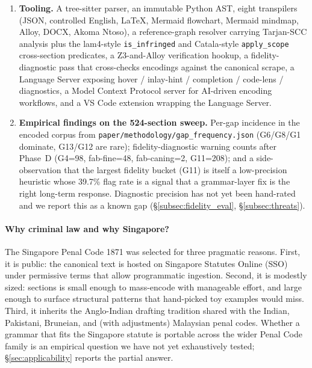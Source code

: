 \begin{enumerate}
\item \textbf{Tooling.} A tree-sitter parser, an immutable Python AST,
eight transpilers (JSON, controlled English, \LaTeX{}, Mermaid
flowchart, Mermaid mindmap, Alloy, DOCX, Akoma Ntoso), a reference-graph resolver carrying Tarjan-SCC
analysis plus the lam4-style \texttt{is\_infringed} and Catala-style
\texttt{apply\_scope} cross-section predicates, a Z3-and-Alloy verification hookup, a fidelity-diagnostic pass
that cross-checks encodings against the canonical scrape, a Language Server
exposing hover / inlay-hint / completion / code-lens / diagnostics, a
Model Context Protocol server for AI-driven encoding workflows, and a
VS Code extension wrapping the Language Server.

\item \textbf{Empirical findings on the 524-section sweep.} Per-gap
incidence in the encoded corpus from
\texttt{paper/methodology/gap\_frequency.json}
(\textsf{G6}/\textsf{G8}/\textsf{G1} dominate, \textsf{G13}/\textsf{G12}
are rare); fidelity-diagnostic warning counts after Phase~D
(\textsf{G4}=98, fab-fine=48, fab-caning=2, \textsf{G11}=208); and a
side-observation that the largest fidelity bucket (\textsf{G11}) is
itself a low-precision heuristic whose 39.7\% flag rate is a signal
that a grammar-layer fix is the right long-term response. Diagnostic
precision has not yet been hand-rated and we report this as a known
gap (\S\ref{subsec:fidelity_eval}, \S\ref{subsec:threats}).
\end{enumerate}

\paragraph{Why criminal law and why Singapore?} The Singapore Penal
Code 1871 was selected for three pragmatic reasons. First, it is
public: the canonical text is hosted on Singapore Statutes Online
(SSO)~\cite{singaporepenalcode} under permissive terms that allow
programmatic ingestion. Second, it is modestly sized:
\statRawSections{} sections is small enough to mass-encode with
manageable effort, and large enough to surface structural patterns
that hand-picked toy examples would miss. Third, it inherits the
Anglo-Indian drafting tradition shared with the Indian, Pakistani,
Bruneian, and (with adjustments) Malaysian penal codes. Whether a
grammar that fits the Singapore statute is portable across the wider
Penal Code family is an empirical question we have not yet
exhaustively tested; \S\ref{sec:applicability} reports the partial
answer.

